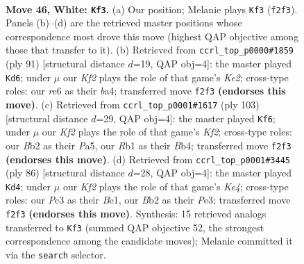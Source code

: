 \documentclass[11pt]{article}
\begin{document}
\clearpage

\begin{figure}[p]\centering
\begin{subfigure}{0.46\textwidth}\centering
\resizebox{\linewidth}{!}{%
\newchessgame
\chessboard[
  setfen={6k1/3n4/4r3/8/p1p5/P1P3Pp/1BP2K1P/1R6 w - - 9 46},
  showmover=false,
  pgfstyle=straightmove, color=movearrow, markmove={f2-f3}
]}
\caption{}
\end{subfigure}\hfill
\begin{subfigure}{0.46\textwidth}\centering
\resizebox{\linewidth}{!}{%
\newchessgame
\chessboard[
  setfen={8/4k3/4p1p1/4p3/B3P2p/2P3bP/4K1P1/8 b - - 4 46},
  showmover=false,
  pgfstyle=straightmove, color=movearrow, markmove={e7-d6}
]}
\caption{}
\end{subfigure}
\\[4pt]
\begin{subfigure}{0.46\textwidth}\centering
\resizebox{\linewidth}{!}{%
\newchessgame
\chessboard[
  setfen={8/5k2/p3p3/p2p4/Pb1P2p1/4P1P1/2B5/5K2 b - - 1 52},
  showmover=false,
  pgfstyle=straightmove, color=movearrow, markmove={f7-f6}
]}
\caption{}
\end{subfigure}\hfill
\begin{subfigure}{0.46\textwidth}\centering
\resizebox{\linewidth}{!}{%
\newchessgame
\chessboard[
  setfen={1b6/8/p3k1p1/Pp4Pp/1P2K2P/4P3/8/4B3 w - - 1 44},
  showmover=false,
  pgfstyle=straightmove, color=movearrow, markmove={e4-d4}
]}
\caption{}
\end{subfigure}
\caption{\textbf{Move 46, White: \texttt{Kf3}.} (a) Our position; Melanie plays \texttt{Kf3} (\texttt{f2f3}). Panels (b)--(d) are the retrieved master positions whose correspondence most drove this move (highest QAP objective among those that transfer to it). (b) Retrieved from \texttt{ccrl\_top\_p0000\#1859} (ply 91) [structural distance $d$=19, QAP obj=4]: the master played \texttt{Kd6}; under $\mu$ our \emph{Kf2} plays the role of that game's \emph{Ke2}; cross-type roles: our \emph{r}e6 as their \emph{b}a4; transferred move \texttt{f2f3} \textbf{(endorses this move)}. (c) Retrieved from \texttt{ccrl\_top\_p0001\#1617} (ply 103) [structural distance $d$=29, QAP obj=4]: the master played \texttt{Kf6}; under $\mu$ our \emph{Kf2} plays the role of that game's \emph{Kf2}; cross-type roles: our \emph{B}b2 as their \emph{P}a5, our \emph{R}b1 as their \emph{B}b4; transferred move \texttt{f2f3} \textbf{(endorses this move)}. (d) Retrieved from \texttt{ccrl\_top\_p0001\#3445} (ply 86) [structural distance $d$=28, QAP obj=4]: the master played \texttt{Kd4}; under $\mu$ our \emph{Kf2} plays the role of that game's \emph{Ke4}; cross-type roles: our \emph{P}c3 as their \emph{B}e1, our \emph{B}b2 as their \emph{P}e3; transferred move \texttt{f2f3} \textbf{(endorses this move)}. Synthesis: 15 retrieved analogs transferred to \texttt{Kf3} (summed QAP objective 52, the strongest correspondence among the candidate moves); Melanie committed it via the \texttt{search} selector.}
\label{fig:thought-m90}
\end{figure}
\end{document}
